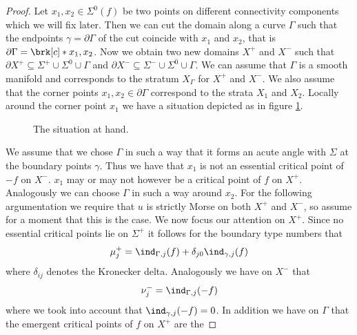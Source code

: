 \begin{proof}
  Let $x_1,x_2\in\Sigma^0(f)$ be two points on different connectivity components which we will fix later.
  Then we can cut the domain along a curve $\Gamma$ such that the endpoints $\gamma=\partial\Gamma$
  of the cut coincide with $x_1$ and $x_2$, that is $\partial\Gamma=\brk[c]*{x_1,x_2}$.
  Now we obtain two new domains $X^+$ and $X^-$ such that $\partial X^+ \subseteq\Sigma^+\cup\Sigma^0\cup\Gamma$ and
  $\partial X^-\subseteq\Sigma^-\cup\Sigma^0\cup\Gamma$. We can assume that $\Gamma$ is a smooth manifold and corresponds to the stratum 
  $X_\Gamma$ for $X^+$ and $X^-$. We also assume that the corner points $x_1,x_2\in\partial\Gamma$ correspond to the strata $X_{1}$ and $X_{2}$.
  Locally around the corner point $x_1$ we have a situation depicted as in figure \ref{fi:n2_cutOmega_flowthrough}.
  \begin{figure}
    \centering
    
    \caption{The situation at hand.}
    \label{fi:n2_cutOmega_flowthrough}
  \end{figure}
  We assume that we chose $\Gamma$ in such a way that it forms an acute angle with $\Sigma$ at the boundary points $\gamma$.
  Thus we have that $x_1$ is not an essential critical point of $-f$ on $X^-$.
  $x_1$ may or may not however be a critical point of $f$ on $X^+$.
  Analogously we can choose $\Gamma$ in such a way around $x_2$.
  For the following argumentation we require that $u$ is strictly Morse on both $X^+$ and $X^-$, so assume for a moment that this
  is the case.
  We now focus our attention on $X^+$. Since no essential critical points lie on $\Sigma^+$
  it follows for the boundary type numbers that
  \begin{align}
    \mu^+_j=\ind_{\Gamma,j}(f)+\delta_{j0}\ind_{\gamma,j}(f)\label{eq:n2_disproof_morse_muplus}
  \end{align}
  where $\delta_{ij}$ denotes the Kronecker delta.
  Analogously we have on $X^-$ that
  \begin{align}
    \nu^-_j=\ind_{\Gamma,j}(-f)\label{eq:n2_disproof_morse_numinus}
  \end{align}
  where we took into account that $\ind_{\gamma,j}(-f)=0$.
  In addition we have on $\Gamma$ that the emergent critical points of $f$ on $X^+$ are the

\end{proof}
